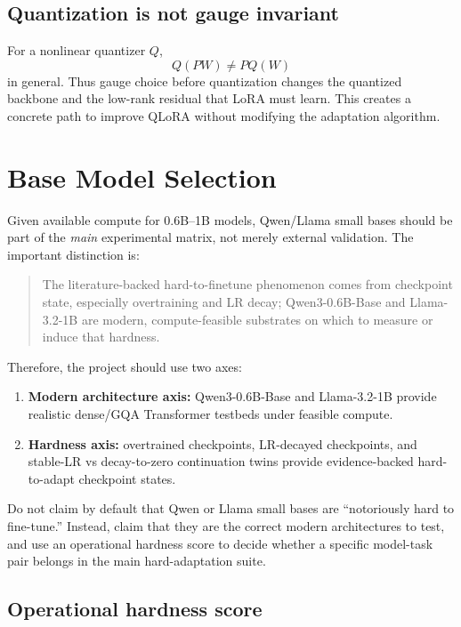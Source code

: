 \documentclass[11pt]{article}
\begin{document}
\subsection{Quantization is not gauge invariant}

For a nonlinear quantizer $Q$,
\[
    Q(PW)\neq P Q(W)
\]
in general. Thus gauge choice before quantization changes the quantized backbone and the low-rank residual that LoRA must learn. This creates a concrete path to improve QLoRA without modifying the adaptation algorithm.

\section{Base Model Selection}

Given available compute for 0.6B--1B models, Qwen/Llama small bases should be part of the \emph{main} experimental matrix, not merely external validation. The important distinction is:

\begin{quote}
The literature-backed hard-to-finetune phenomenon comes from checkpoint state, especially overtraining and LR decay; Qwen3-0.6B-Base and Llama-3.2-1B are modern, compute-feasible substrates on which to measure or induce that hardness.
\end{quote}

Therefore, the project should use two axes:
\begin{enumerate}[leftmargin=*]
    \item \textbf{Modern architecture axis:} Qwen3-0.6B-Base and Llama-3.2-1B provide realistic dense/GQA Transformer testbeds under feasible compute.
    \item \textbf{Hardness axis:} overtrained checkpoints, LR-decayed checkpoints, and stable-LR vs decay-to-zero continuation twins provide evidence-backed hard-to-adapt checkpoint states.
\end{enumerate}

Do not claim by default that Qwen or Llama small bases are ``notoriously hard to fine-tune.'' Instead, claim that they are the correct modern architectures to test, and use an operational hardness score to decide whether a specific model-task pair belongs in the main hard-adaptation suite.

\subsection{Operational hardness score}
\end{document}
